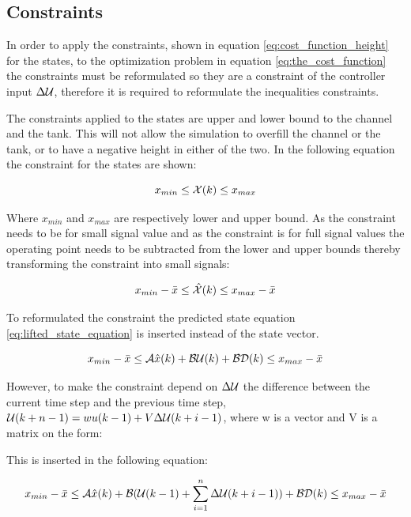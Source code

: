 \subsection{Constraints}\label{subse:constraints}

In order to apply the constraints, shown in equation \ref{eq:cost_function_height} for the states, to the optimization problem in equation \ref{eq:the_cost_function} the constraints must be reformulated so they are a constraint of the controller input $\Delta\CMcal{U}$, therefore it is required to reformulate the inequalities constraints. 

The constraints applied to the states are upper and lower bound to the channel and the tank. This will not allow the simulation to overfill the channel or the tank, or to have a negative height in either of the two. In the following equation the constraint for the states are shown:  


\begin{equation}
    x_{min} \leq \CMcal{X}(k) \leq x_{max}
\end{equation}

Where $x_{min}$ and $x_{max}$ are respectively lower and upper bound. As the constraint needs to be for small signal value and as the constraint is for full signal values the operating point needs to be subtracted from the lower and upper bounds thereby transforming the constraint into small signals:

\begin{equation}
    x_{min}- \bar{x} \leq \hat{\CMcal{X}}(k) \leq x_{max}-\bar{x}
\end{equation}

To reformulated the constraint the predicted state equation \ref{eq:lifted_state_equation} is inserted instead of the state vector.

\begin{equation}
     x_{min}- \bar{x} \leq \CMcal{A}\hat{x}(k)+\CMcal{B}\CMcal{U}(k)+\CMcal{BD}(k) \leq x_{max}-\bar{x}
 \end{equation} 

However, to make the constraint depend on $\Delta \CMcal{U}$ the difference between the current time step and the previous time step, $\CMcal{U}(k+n-1) = wu(k-1) +V\Delta \CMcal{U}(k+i-1) $, where w is a vector and V is a matrix on the form: 


This is inserted in the following equation: 

\begin{equation}
     x_{min}- \bar{x} \leq \CMcal{A}\hat{x}(k)+\CMcal{B}(\CMcal{U}(k-1)+\sum_{i=1}^n \Delta\CMcal{U}(k+i-1))+\CMcal{B}\CMcal{D}(k) \leq x_{max}-\bar{x}
 \end{equation} 


